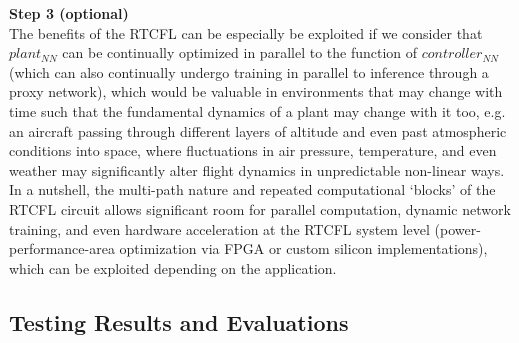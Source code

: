 \documentclass[10pt,twocolumn,letterpaper]{article}
\begin{document}
            \textbf{Step 3 (optional)}\\
            The benefits of the RTCFL can be especially be exploited if we consider that $plant_{NN}$ can be continually
            optimized in parallel to the function of $controller_{NN}$ (which can also continually undergo training in
            parallel to inference through a proxy network), which would be valuable in environments that may change with
            time such that the fundamental dynamics of a plant may change with it too, e.g. an aircraft passing through
            different layers of altitude and even past atmospheric conditions into space, where fluctuations in air
            pressure, temperature, and even weather may significantly alter flight dynamics in unpredictable non-linear
            ways. In a nutshell, the multi-path nature and repeated computational `blocks' of the RTCFL circuit allows
            significant room for parallel computation, dynamic network training, and even hardware acceleration at the
            RTCFL system level (power-performance-area optimization via FPGA or custom silicon implementations), which
            can be exploited depending on the application.

        \subsection{Testing Results and Evaluations} \label{RTCFLtesting}

            
            
            
\end{document}
